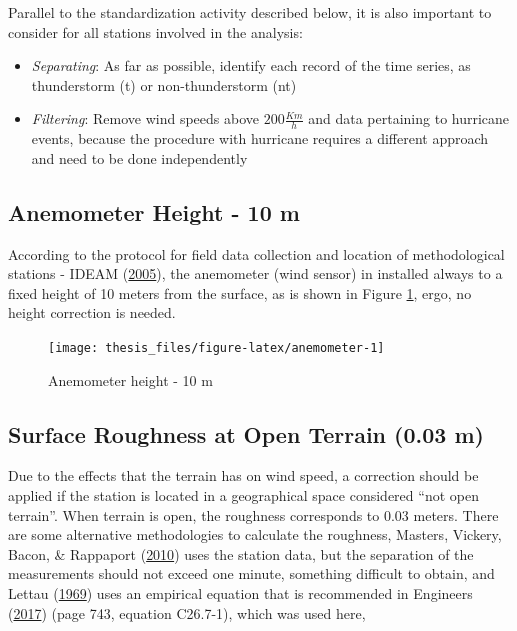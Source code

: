 \documentclass[12pt,oneside]{reedthesis}
\begin{document}
Parallel to the standardization activity described below, it is also important to consider for all stations involved in the analysis:
\begin{itemize}
\item
  \emph{Separating}: As far as possible, identify each record of the time series, as thunderstorm (t) or non-thunderstorm (nt)
\item
  \emph{Filtering}: Remove wind speeds above \(200 \frac{Km}{h}\) and data pertaining to hurricane events, because the procedure with hurricane requires a different approach and need to be done independently
\end{itemize}
\hypertarget{anemometer-height---10-m}{%
\subsection{Anemometer Height - 10 m}\label{anemometer-height---10-m}}

According to the protocol for field data collection and location of methodological stations - IDEAM (\protect\hyperlink{ref-ideam2005}{2005}), the anemometer (wind sensor) in installed always to a fixed height of 10 meters from the surface, as is shown in Figure \ref{fig:anemometer}, ergo, no height correction is needed.
\begin{figure}

{\centering \texttt{[image: thesis\_files/figure-latex/anemometer-1]} 

}

\caption{Anemometer height - 10 m}\label{fig:anemometer}
\end{figure}
\hypertarget{rmd-roughness}{%
\subsection{Surface Roughness at Open Terrain (0.03 m)}\label{rmd-roughness}}

Due to the effects that the terrain has on wind speed, a correction should be applied if the station is located in a geographical space considered ``not open terrain''. When terrain is open, the roughness corresponds to 0.03 meters. There are some alternative methodologies to calculate the roughness, Masters, Vickery, Bacon, \& Rappaport (\protect\hyperlink{ref-Masters2010}{2010}) uses the station data, but the separation of the measurements should not exceed one minute, something difficult to obtain, and Lettau (\protect\hyperlink{ref-Lettau1969}{1969}) uses an empirical equation that is recommended in Engineers (\protect\hyperlink{ref-Asce2017}{2017}) (page 743, equation C26.7-1), which was used here,
\end{document}
